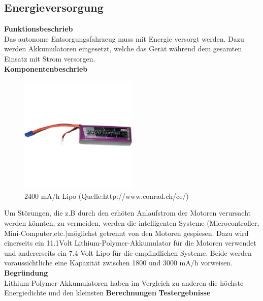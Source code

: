\subsection{Energieversorgung}

\textbf{Funktionsbeschrieb}\\[0.2cm]
Das autonome Entsorgungsfahrzeug muss mit Energie versorgt werden. Dazu werden Akkumulatoren eingesetzt, welche das Gerät während dem gesamten Einsatz mit Strom versorgen. 
\\[0.2cm]
\textbf{Komponentenbeschrieb}\\[0.2cm]
\begin{figure}[h]
	\centering
	\includegraphics[width=0.5\textwidth]{./Images/Lipo.JPG}
	\caption{2400 mA/h Lipo  (Quelle:http://www.conrad.ch/ce/)}
	
\end{figure}
Um Störungen, die z.B durch den erhöten Anlaufstrom der Motoren verursacht werden könnten, zu vermeiden, werden die intelligenten Systeme (Microcontroller, Mini-Computer,etc.)möglichst getrennt von den Motoren gespiesen. Dazu wird einerseits ein 11.1Volt Lithium-Polymer-Akkumulator für die Motoren verwendet und andererseits ein 7.4 Volt Lipo für die empfindlichen Systeme. Beide werden voraussichtliche eine Kapazität zwischen 1800 und 3000 mA/h vorweisen.
 \\[0.2cm]
\textbf{Begründung}\\
Lithium-Polymer-Akkumulatoren haben im Vergleich zu anderen die höchste Energiedichte und den kleinsten 
\textbf{Berechnungen}
\textbf{Testergebnisse}